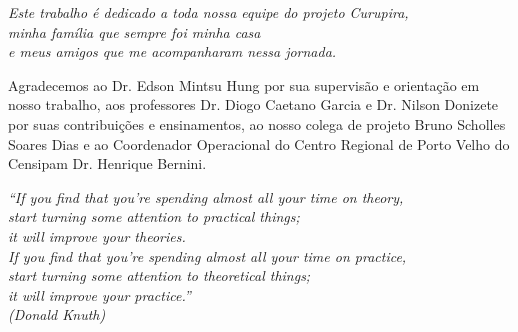 \documentclass[
	12pt,				%
	openright,			%
	oneside,			%
	a4paper,			%
	sumario=tradicional,
	english,           %
	brazil             %
	]{unbtex}
\begin{document}
\begin{dedicatoria}
   \centering
   \vspace*{\fill}
   
   \textit{Este trabalho é dedicado a toda nossa equipe do projeto Curupira, \\ minha família que sempre foi minha casa \\ e meus amigos que me acompanharam nessa jornada.} \\
   
   \vspace*{\fill}
\end{dedicatoria}

\begin{agradecimentos}

Agradecemos ao Dr. Edson Mintsu Hung por sua supervisão e orientação em nosso trabalho, aos professores Dr. Diogo Caetano Garcia e Dr. Nilson Donizete por suas contribuições e ensinamentos, ao nosso colega de projeto Bruno Scholles Soares Dias e ao Coordenador Operacional do Centro Regional de Porto Velho do Censipam Dr. Henrique Bernini. 


\end{agradecimentos}

\begin{epigrafe}
    \vspace*{\fill}
	\begin{flushright}
		\textit{``If you find that you're spending almost all your time on theory,\\ start turning some attention to practical things; \\ it will improve your theories.\\ If you find that you're spending almost all your time on practice, \\ start turning some attention to theoretical things; \\ it will improve your practice.''\\
		(Donald Knuth)} 
	\end{flushright}
\end{epigrafe}
\end{document}
